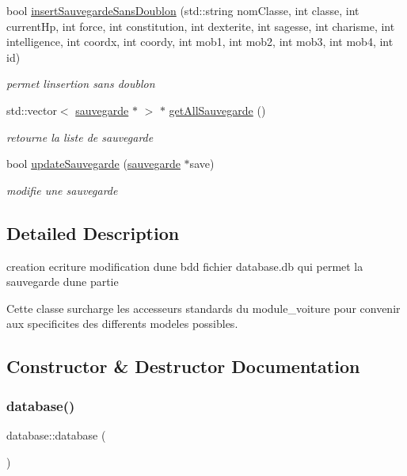 \begin{DoxyCompactItemize}
bool \mbox{\hyperlink{classdatabase_a287490545fa5fe82219162c6254abbfc}{insert\+Sauvegarde\+Sans\+Doublon}} (std\+::string nom\+Classe, int classe, int current\+Hp, int force, int constitution, int dexterite, int sagesse, int charisme, int intelligence, int coordx, int coordy, int mob1, int mob2, int mob3, int mob4, int id)
\begin{DoxyCompactList}\small\item\em permet l\textquotesingle{}insertion sans doublon \end{DoxyCompactList}\item 
std\+::vector$<$ \mbox{\hyperlink{classsauvegarde}{sauvegarde}} $\ast$ $>$ $\ast$ \mbox{\hyperlink{classdatabase_abf69b9f69151bd9697365b9d69026273}{get\+All\+Sauvegarde}} ()
\begin{DoxyCompactList}\small\item\em retourne la liste de sauvegarde \end{DoxyCompactList}\item 
bool \mbox{\hyperlink{classdatabase_a5112834fd0407d9bd04eabf5a2ebe705}{update\+Sauvegarde}} (\mbox{\hyperlink{classsauvegarde}{sauvegarde}} $\ast$save)
\begin{DoxyCompactList}\small\item\em modifie une sauvegarde \end{DoxyCompactList}\end{DoxyCompactItemize}


\subsection{Detailed Description}
creation ecriture modification d\textquotesingle{}une bdd fichier database.\+db qui permet la sauvegarde d\textquotesingle{}une partie 

Cette classe surcharge les accesseurs standards du module\+\_\+voiture pour convenir aux specificites des differents modeles possibles. 

\subsection{Constructor \& Destructor Documentation}
\mbox{\label{classdatabase_a35ec480ed529a9d092a7ebc5472b767f}} 
\subsubsection{\texorpdfstring{database()}{database()}}
{\footnotesize\ttfamily database\+::database (\begin{DoxyParamCaption}{ }\end{DoxyParamCaption})}



